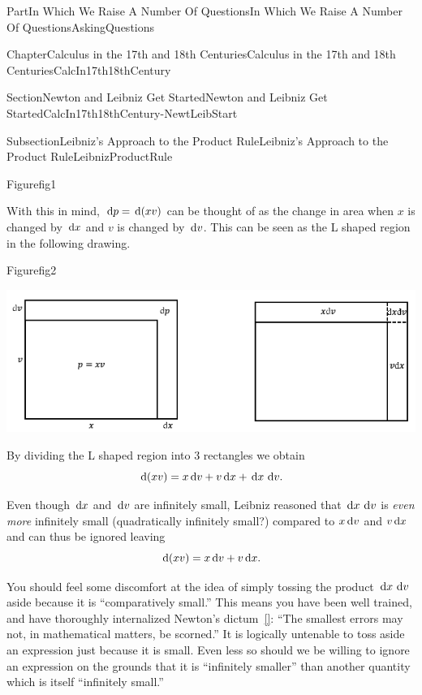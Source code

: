 \documentclass[oneside,10pt,]{book}
\newcommand{\xreffont}{\relax}
\numberwithin{equation}{part}
\newcommand{\dx}[1]{\,{\rm d}#1}
\begin{document}
\begin{partptx}{Part}{In Which We Raise A Number Of Questions}{}{In Which We Raise A Number Of Questions}{}{}{AskingQuestions}
\begin{chapterptx}{Chapter}{Calculus in the 17th and 18th Centuries}{}{Calculus in the 17th and 18th Centuries}{}{}{CalcIn17th18thCentury}
\begin{sectionptx}{Section}{Newton and Leibniz Get Started}{}{Newton and Leibniz Get Started}{}{}{CalcIn17th18thCentury-NewtLeibStart}
\begin{subsectionptx}{Subsection}{Leibniz's Approach to the Product Rule}{}{Leibniz's Approach to the Product Rule}{}{}{LeibnizProductRule}
\begin{figureptx}{Figure}{}{fig1}{}
\end{figureptx}%
With this in mind, \(\dx{ p}=\dx{(xv)}\) can be thought of as the change in area when \(x\) is changed by \(\dx{ x}\) and \(v\) is changed by \(\dx{ v}\).  This can be seen as the L shaped region in the following drawing.%
\begin{figureptx}{Figure}{}{fig2}{}%
\begin{image}{0.05}{0.9}{0.05}{}%
\includegraphics[width=\linewidth]{external/images/fig2.png}
\end{image}%
\tcblower
\end{figureptx}%
By dividing the L shaped region into 3 rectangles we obtain%
\begin{equation}
\dx{(xv)}=x\dx{ v}+v\dx{ x}+\dx{ x}\,\dx{ v}\text{.}\label{eq_LeibnizProductRule}
\end{equation}
%
\par
Even though \(\dx{ x}\) and \(\dx{ v}\) are infinitely small, Leibniz reasoned that \(\dx{ x}\,\dx{ v}\) is \emph{even more} infinitely small (quadratically infinitely small?)  compared to \(x\dx{ v}\) and \(v\dx{ x}\) and can thus be ignored leaving%
\begin{equation*}
\dx{ (xv)}=x\dx{ v}+v\dx{ x}\text{.}
\end{equation*}
%
\par
You should feel some discomfort at the idea of simply tossing the product \(\dx{ x}\,\dx{ v}\) aside because it is ``comparatively small.'' This means you have been well trained, and have thoroughly internalized Newton's  dictum~\hyperlink{newton45__sir_isaac_two_treat_quadr}{[{\xreffont 10}]}: ``The smallest errors may not, in mathematical matters, be scorned.'' It is logically untenable to toss aside an expression just because it is small.  Even less so should we be willing to ignore an expression on the grounds that it is ``infinitely smaller'' than another quantity which is itself ``infinitely small.''%
\par

\end{subsectionptx}
\end{sectionptx}
\end{chapterptx}
\end{partptx}
\end{document}
